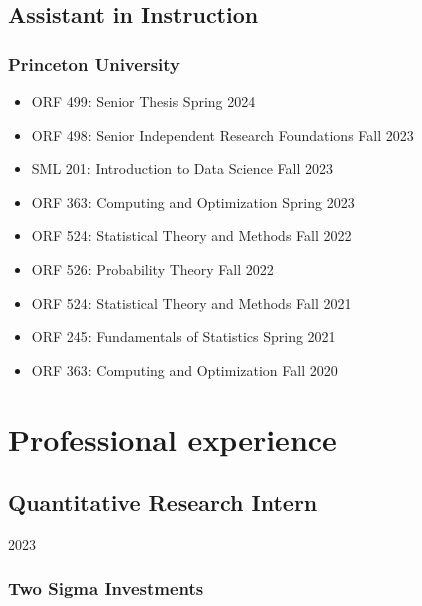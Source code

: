 \documentclass{wgu-cv}
\begin{document}
\subsection{Assistant in Instruction}{}
\subsubsection{Princeton University}

\begin{itemize}

  \item
    ORF 499: Senior Thesis
    \hfill Spring 2024

  \item
    ORF 498: Senior Independent Research Foundations
    \hfill Fall 2023

  \item
    SML 201: Introduction to Data Science
    \hfill Fall 2023

  \item
    ORF 363: Computing and Optimization
    \hfill Spring 2023

  \item
    ORF 524: Statistical Theory and Methods
    \hfill Fall 2022

  \item
    ORF 526: Probability Theory
    \hfill Fall 2022

  \item
    ORF 524: Statistical Theory and Methods
    \hfill Fall 2021

  \item
    ORF 245: Fundamentals of Statistics
    \hfill Spring 2021

  \item
    ORF 363: Computing and Optimization
    \hfill Fall 2020

\end{itemize}

\section{Professional experience}

\subsection{Quantitative Research Intern}
{2023}
\subsubsection{Two Sigma Investments}
\vspace{-0.20cm}
\end{document}
